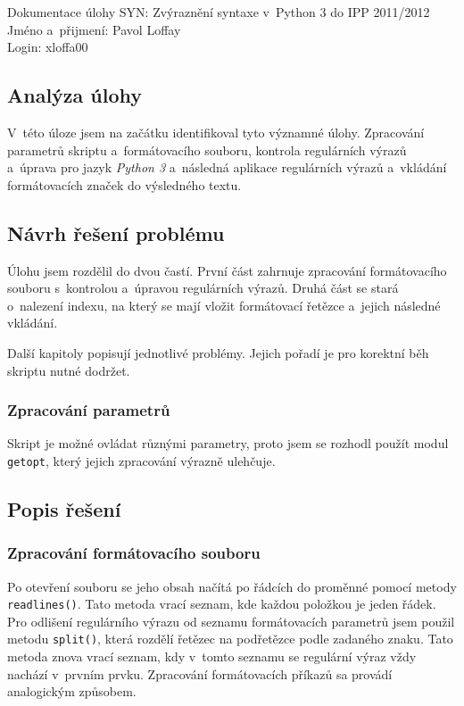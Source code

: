 \documentclass[10pt,a4paper]{article}
\begin{document}
\noindent Dokumentace úlohy SYN: Zvýraznění syntaxe v~Python 3 do IPP 2011/2012 \\
Jméno a~přijmení: Pavol Loffay \\
Login: xloffa00

\setcounter{section}{1}

\subsection{Analýza úlohy}
V~této úloze jsem na začátku identifikoval tyto významné úlohy.
Zpracování parametrů skriptu
a~formátovacího souboru, kontrola regulárních výrazů a~úprava pro jazyk 
\emph{Python 3} a~následná aplikace regulárních výrazů
a~vkládání formátovacích značek do výsledného textu.

\subsection{Návrh řešení problému}
Úlohu jsem rozdělil do dvou častí. První část zahrnuje zpracování 
formátovacího souboru s~kontrolou a~úpravou regulárních výrazů.
Druhá část se stará o~nalezení indexu, na který se mají vložit 
formátovací řetězce a~jejich následné vkládání.

Další kapitoly popisují jednotlivé problémy. Jejich pořadí je pro
korektní běh skriptu nutné dodržet.

\subsubsection{Zpracování parametrů}
Skript je možné ovládat různými parametry, proto jsem se rozhodl
použít modul \texttt{getopt}, který jejich zpracování výrazně ulehčuje.

\subsection{Popis řešení}
\subsubsection{Zpracování formátovacího souboru}
Po otevření souboru se jeho obsah načítá po řádcích do proměnné pomocí metody
\texttt{readlines()}. Tato metoda vrací seznam, kde každou položkou je jeden řádek. Pro odlišení 
regulárního výrazu od seznamu formátovacích parametrů jsem použil metodu
\texttt{split()}, která rozdělí řetězec na podřetězce podle zadaného znaku.
Tato metoda znova vrací seznam, kdy v~tomto seznamu se regulární výraz vždy 
nachází v~prvním prvku. Zpracování formátovacích příkazů sa provádí
analogickým způsobem. 
\end{document}
